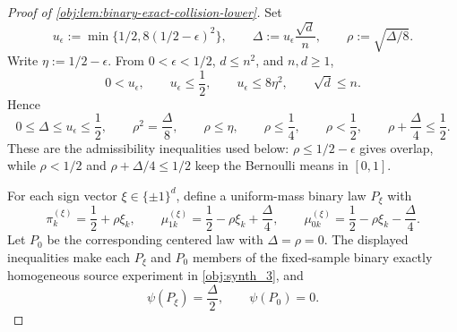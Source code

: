 \documentclass[11pt]{article}
\begin{document}
\begin{proof}[Proof of \cref{obj:lem:binary-exact-collision-lower}]
Set
\[
u_\epsilon:=\min\{1/2,8(1/2-\epsilon)^2\},
\qquad
\Delta:=u_\epsilon\frac{\sqrt d}{n},
\qquad
\rho:=\sqrt{\Delta/8}.
\]
Write \(\eta:=1/2-\epsilon\).  From \(0<\epsilon<1/2\), \(d\le n^2\), and \(n,d\ge1\),
\[
0<u_\epsilon,
\qquad
u_\epsilon\le\frac12,
\qquad
u_\epsilon\le 8\eta^2,
\qquad
\sqrt d\le n.
\]
Hence
\[
0\le\Delta\le u_\epsilon\le\frac12,
\qquad
\rho^2=\frac{\Delta}{8},
\qquad
\rho\le\eta,
\qquad
\rho\le\frac14,
\qquad
\rho<\frac12,
\qquad
\rho+\frac{\Delta}{4}\le\frac12.
\]
These are the admissibility inequalities used below: \(\rho\le1/2-\epsilon\) gives overlap, while \(\rho<1/2\) and \(\rho+\Delta/4\le1/2\) keep the Bernoulli means in \([0,1]\). %

For each sign vector \(\xi\in\{\pm1\}^d\), define a uniform-mass binary law \(P_\xi\) with
\[
\pi_k^{(\xi)}=\frac12+\rho\xi_k,
\qquad
\mu_{1k}^{(\xi)}=\frac12-\rho\xi_k+\frac{\Delta}{4},
\qquad
\mu_{0k}^{(\xi)}=\frac12-\rho\xi_k-\frac{\Delta}{4}.
\]
Let \(P_0\) be the corresponding centered law with \(\Delta=\rho=0\).  The displayed inequalities make each \(P_\xi\) and \(P_0\) members of the fixed-sample binary exactly homogeneous source experiment in \cref{obj:synth_3}, and
\[
\psi(P_\xi)=\frac{\Delta}{2},
\qquad
\psi(P_0)=0.
\] %


\end{proof}
\end{document}
